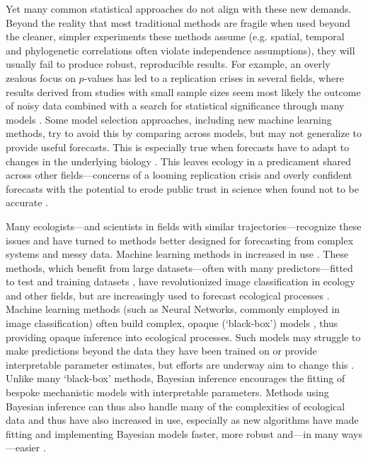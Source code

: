 \documentclass[11pt]{article}
\newcommand{\R}[1]{\label{}\linelabel{#1}}
\begin{document}
Yet many common statistical approaches do not align with these new demands. Beyond the reality that most traditional methods are fragile when used beyond the cleaner, simpler experiments these methods assume (e.g. spatial, temporal and phylogenetic correlations often violate independence assumptions), they will usually fail to produce robust, reproducible results. For example, an overly zealous focus on $p$-values has led to a replication crises in several fields, where results derived from studies with small sample sizes seem most likely the outcome of noisy data combined with a search for statistical significance through many models \citep[effectively a garden of forking paths,][]{halsey2015,loken2017}. Some model selection approaches, including new machine learning methods, try to avoid this by comparing across models, but may not generalize to provide useful forecasts. This is especially true when forecasts have to adapt to changes in the underlying biology  \citep{boettiger2022forecast}. This leaves ecology in a predicament shared across other fields---concerns of a looming replication crisis \citep{filazzola2021replication,fraser2020role} and overly confident forecasts with the potential to erode public trust in science when found not to be accurate \citep{leroux2019prevalence,boettiger2022forecast}. 

Many ecologists---and scientists in fields with similar trajectories---recognize these issues and have turned to methods better designed for forecasting from complex systems and messy data. Machine learning methods in increased in use \citep{pichler2023machine}. These methods, which benefit from large datasets---often with many predictors---fitted to test and training datasets \citep{breiman2001statistical}, have revolutionized image classification in ecology and other fields, but are increasingly used to forecast ecological processes \citep[e.g.,][]{zwart2023near}. Machine learning methods (such as Neural Networks, commonly employed in image classification) often build complex, opaque (`black-box') models \citep{CoxTwoCultures,EfronTwoCultures,shmueli2010explain}, thus providing opaque inference into ecological processes. Such models may struggle to make predictions beyond the data they have been trained on or provide interpretable parameter estimates, but efforts are underway aim to change this \citep[e.g.,][]{kutz2023machine}.  Unlike many `black-box' methods, \R{Rnewmodels}Bayesian inference encourages the fitting of bespoke mechanistic models with interpretable parameters. Methods using Bayesian inference\R{rrinference} \citep{anderson2021trends} can thus also handle many of the complexities of ecological data \citep{hobbs2006alternatives} and thus have also increased in use, especially as new algorithms \citep[e.g. Hamiltonian Monte Carlo,][]{nuts2014,betan2019} have made fitting and implementing Bayesian models faster, more robust and---in many ways---easier \citep{Carpenter:2017stan}. 
\end{document}
